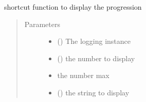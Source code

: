 \documentclass[a4paper,10pt,english]{sphinxmanual}
\begin{document}
\begin{fulllineitems}
\label{\detokenize{commands/apidoc/src:src.fork.show_progress}}
shortcut function to display the progression
\begin{quote}\begin{description}
\item[{Parameters}] \leavevmode\begin{itemize}
\item {} 
 () \textendash{} The logging instance

\item {} 
 () \textendash{} the number to display

\item {} 
 \textendash{} the number max

\item {} 
 () \textendash{} the string to display

\end{itemize}

\end{description}\end{quote}

\end{fulllineitems}

\end{document}
